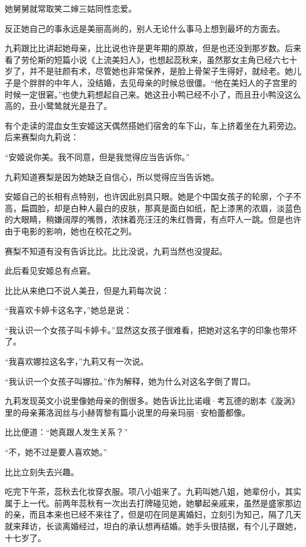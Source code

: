 \par 她舅舅就常取笑二婶三姑同性恋爱。
\par 反正她自己的事永远是美丽高尚的，别人无论什么事马上想到最坏的方面去。
\par 九莉跟比比讲起她母亲，比比说也许是更年期的原故，但是也还没到那岁数。后来看了劳伦斯的短篇小说《上流美妇人》，也想起蕊秋来，虽然那女主角已经六七十岁了，并不是驻颜有术，尽管她也非常保养，是脸上骨架子生得好，就经老。她儿子是个胖胖的中年人，没结婚，去见母亲的时候总很僵。“他在美妇人的子宫里的时候一定很窘。”也使九莉想起自己来。她这丑小鸭已经不小了，而且丑小鸭没这么高的，丑小鹭鸶就光是丑了。
\par 有个走读的混血女生安姬这天偶然搭她们宿舍的车下山，车上挤着坐在九莉旁边。后来赛梨向九莉说：
\par “安姬说你美。我不同意，但是我觉得应当告诉你。”
\par 九莉知道赛梨是因为她缺乏自信心，所以觉得应当告诉她。
\par 安姬自己的长相有点特别，也许因此别具只眼。她是个中国女孩子的轮廓，个子不高，扁圆脸，却是白种人最白的皮肤，那真是面白如纸，配上漆黑的浓眉，淡蓝色的大眼睛，稍嫌阔厚的嘴唇，浓抹着亮汪汪的朱红唇膏，有点吓人一跳。但是也许由于电影的影响，她也在校花之列。
\par 赛梨不知道有没有告诉比比。比比没说，九莉当然也没提起。
\par 此后看见安姬总有点窘。
\par 比比从来绝口不说人美丑，但是九莉每次说：
\par “我喜欢卡婷卡这名字，”她总是说：
\par “我认识一个女孩子叫卡婷卡。”显然这女孩子很难看，把她对这名字的印象也带坏了。
\par “我喜欢娜拉这名字，”九莉又有一次说。
\par “我认识一个女孩子叫娜拉。”作为解释，她为什么对这名字倒了胃口。
\par 九莉发现英文小说里像她母亲的倒很多。她告诉比比诺峨·考瓦德的剧本《漩涡》里的母亲茀洛润丝与小赫胥黎有篇小说里的母亲玛丽·安柏蕾都像。
\par 比比便道：“她真跟人发生关系？”
\par “不，她不过是要人喜欢她。”
\par 比比立刻失去兴趣。
\par 吃完下午茶，蕊秋去化妆穿衣服。项八小姐来了。九莉叫她八姐，她辈份小，其实属于上一代。前两年蕊秋有一次出去打牌碰见她，她攀起亲戚来，虽然是盛家那边的亲，而且本来也已经不来往了，但是叨在同是离婚妇，立刻引为知己，隔了几天就来拜访，长谈离婚经过，坦白的承认想再结婚。她手头很拮据，有个儿子跟她，十七岁了。
